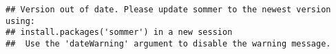\documentclass[
]{article}
\newenvironment{Shaded}{\begin{snugshade}}{\end{snugshade}}
\newcommand{\AttributeTok}[1]{\textcolor[rgb]{0.13,0.29,0.53}{#1}}
\newcommand{\CommentTok}[1]{\textcolor[rgb]{0.56,0.35,0.01}{\textit{#1}}}
\newcommand{\FunctionTok}[1]{\textcolor[rgb]{0.13,0.29,0.53}{\textbf{#1}}}
\newcommand{\NormalTok}[1]{#1}
\newcommand{\OtherTok}[1]{\textcolor[rgb]{0.56,0.35,0.01}{#1}}
\newcommand{\SpecialCharTok}[1]{\textcolor[rgb]{0.81,0.36,0.00}{\textbf{#1}}}
\newcommand{\StringTok}[1]{\textcolor[rgb]{0.31,0.60,0.02}{#1}}
\begin{document}
\begin{verbatim}
## Version out of date. Please update sommer to the newest version using:
## install.packages('sommer') in a new session
##  Use the 'dateWarning' argument to disable the warning message.
\end{verbatim}

\begin{Shaded}
\end{Shaded}
\end{document}
